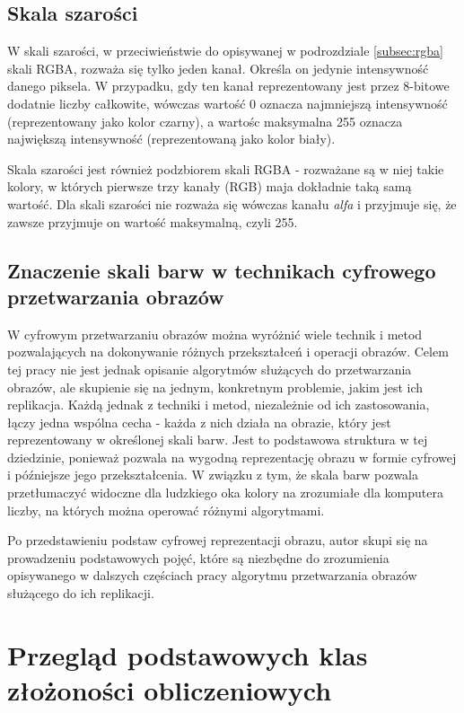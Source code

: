 \subsection{Skala szarości}

W skali szarości, w przeciwieństwie do opisywanej w podrozdziale \ref{subsec:rgba} skali RGBA, rozważa się tylko jeden kanał. Określa on jedynie intensywność danego piksela. W przypadku, gdy ten kanał reprezentowany jest przez 8-bitowe dodatnie liczby całkowite, wówczas wartość 0 oznacza najmniejszą intensywność (reprezentowany jako kolor czarny), a wartośc maksymalna 255 oznacza największą intensywność (reprezentowaną jako kolor biały).

Skala szarości jest również podzbiorem skali RGBA - rozważane są w niej takie kolory, w których pierwsze trzy kanały (RGB) maja dokładnie taką samą wartość. Dla skali szarości nie rozważa się wówczas kanału \textit{alfa} i przyjmuje się, że zawsze przyjmuje on wartość maksymalną, czyli 255.

\subsection{Znaczenie skali barw w technikach cyfrowego przetwarzania obrazów}
W cyfrowym przetwarzaniu obrazów można wyróżnić wiele technik i metod pozwalających na dokonywanie różnych przekształceń i operacji obrazów. Celem tej pracy nie jest jednak opisanie algorytmów służących do przetwarzania obrazów, ale skupienie się na jednym, konkretnym problemie, jakim jest ich replikacja. Każdą jednak z techniki i metod, niezależnie od ich zastosowania, łączy jedna wspólna cecha - każda z nich działa na obrazie, który jest reprezentowany w określonej skali barw. Jest to podstawowa struktura w tej dziedzinie, ponieważ pozwala na wygodną reprezentację obrazu w formie cyfrowej i późniejsze jego przekształcenia. W związku z tym, że skala barw pozwala przetłumaczyć widoczne dla ludzkiego oka kolory na zrozumiałe dla komputera liczby, na których można operować różnymi algorytmami. 

Po przedstawieniu podstaw cyfrowej reprezentacji obrazu, autor skupi się na prowadzeniu podstawowych pojęć, które są niezbędne do zrozumienia opisywanego w dalszych częściach pracy algorytmu przetwarzania obrazów służącego do ich replikacji.

\section{Przegląd podstawowych klas złożoności obliczeniowych}
\label{sec:complexity}

